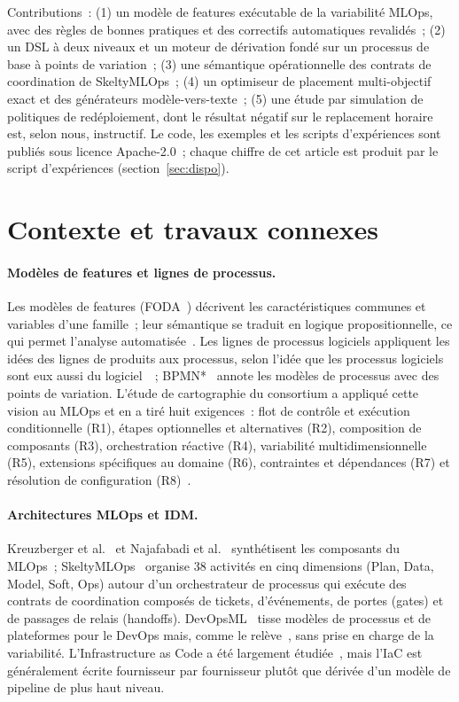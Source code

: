 \documentclass[10pt,a4paper]{article}
\begin{document}
Contributions~: (1) un modèle de features exécutable de la variabilité MLOps, avec
des règles de bonnes pratiques et des correctifs automatiques revalidés~; (2) un DSL
à deux niveaux et un moteur de dérivation fondé sur un processus de base à points de
variation~; (3) une sémantique opérationnelle des contrats de coordination de
SkeltyMLOps~; (4) un optimiseur de placement multi-objectif exact et des générateurs
modèle-vers-texte~; (5) une étude par simulation de politiques de redéploiement, dont
le résultat négatif sur le replacement horaire est, selon nous, instructif. Le code,
les exemples et les scripts d'expériences sont publiés sous licence Apache-2.0~;
chaque chiffre de cet article est produit par le script d'expériences
(section~\ref{sec:dispo}).

\section{Contexte et travaux connexes}
\paragraph{Modèles de features et lignes de processus.} Les modèles de features
(FODA~\cite{kang1990}) décrivent les caractéristiques communes et variables d'une
famille~; leur sémantique se traduit en logique propositionnelle, ce qui permet
l'analyse automatisée~\cite{batory2005,benavides2010}. Les lignes de processus
logiciels appliquent les idées des lignes de produits aux processus, selon l'idée que
les processus logiciels sont eux aussi du logiciel~\cite{osterweil1987}~;
BPMN*~\cite{terenciani2015} annote les modèles de processus avec des points de
variation. L'étude de cartographie du consortium a appliqué cette vision au MLOps et
en a tiré huit exigences~: flot de contrôle et exécution conditionnelle (R1), étapes
optionnelles et alternatives (R2), composition de composants (R3), orchestration
réactive (R4), variabilité multidimensionnelle (R5), extensions spécifiques au
domaine (R6), contraintes et dépendances (R7) et résolution de configuration
(R8)~\cite{elhatimi2025}.

\paragraph{Architectures MLOps et IDM.} Kreuzberger et al.~\cite{kreuzberger2023} et
Najafabadi et al.~\cite{najafabadi2024} synthétisent les composants du MLOps~;
SkeltyMLOps~\cite{daoud2025,daoud2026} organise 38 activités en cinq dimensions
(Plan, Data, Model, Soft, Ops) autour d'un orchestrateur de processus qui exécute des
contrats de coordination composés de tickets, d'événements, de portes (gates) et de
passages de relais (handoffs). DevOpsML~\cite{colantoni2020} tisse modèles de
processus et de plateformes pour le DevOps mais, comme le relève~\cite{elhatimi2025},
sans prise en charge de la variabilité. L'Infrastructure as Code a été largement
étudiée~\cite{rahman2019}, mais l'IaC est généralement écrite fournisseur par
fournisseur plutôt que dérivée d'un modèle de pipeline de plus haut niveau.
\end{document}
